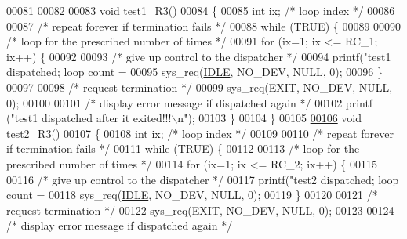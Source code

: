 \begin{DoxyCode}
00081 
00082 
\hypertarget{procs-r3_8c_source_l00083}{}\hyperlink{procs-r3_8c_ae4496e9c01adc7562ce34516c13226a0}{00083} \textcolor{keywordtype}{void} \hyperlink{procs-r3_8c_ae4496e9c01adc7562ce34516c13226a0}{test1_R3}()
00084 \{
00085         \textcolor{keywordtype}{int} ix; \textcolor{comment}{/* loop index */}
00086         
00087         \textcolor{comment}{/* repeat forever if termination fails */}
00088         \textcolor{keywordflow}{while} (TRUE) \{
00089 
00090                 \textcolor{comment}{/* loop for the prescribed number of times */}
00091                 \textcolor{keywordflow}{for} (ix=1; ix <= RC\_1; ix++) \{
00092 
00093                         \textcolor{comment}{/* give up control to the dispatcher */}
00094                         printf(\textcolor{stringliteral}{"test1 dispatched; loop count = %
00095                         sys\_req(\hyperlink{_m_p_x___r5_8h_a9c21a7caee326d7803b94ae1952b27ca}{IDLE}, NO\_DEV, NULL, 0);
00096                 \}
00097 
00098                 \textcolor{comment}{/* request termination */}
00099                 sys\_req(EXIT, NO\_DEV, NULL, 0);
00100 
00101                 \textcolor{comment}{/* display error message if dispatched again */}
00102                 printf (\textcolor{stringliteral}{"test1 dispatched after it exited!!!\(\backslash\)n"});
00103         \}
00104  \}
00105 
\hypertarget{procs-r3_8c_source_l00106}{}\hyperlink{procs-r3_8c_ab61a49e4507b3dba1bfad0cc9510d0a6}{00106} \textcolor{keywordtype}{void} \hyperlink{procs-r3_8c_ab61a49e4507b3dba1bfad0cc9510d0a6}{test2_R3}()
00107 \{
00108         \textcolor{keywordtype}{int} ix; \textcolor{comment}{/* loop index */}
00109         
00110         \textcolor{comment}{/* repeat forever if termination fails */}
00111         \textcolor{keywordflow}{while} (TRUE) \{
00112 
00113                 \textcolor{comment}{/* loop for the prescribed number of times */}
00114                 \textcolor{keywordflow}{for} (ix=1; ix <= RC\_2; ix++) \{
00115 
00116                         \textcolor{comment}{/* give up control to the dispatcher */}
00117                         printf(\textcolor{stringliteral}{"test2 dispatched; loop count = %
00118                         sys\_req(\hyperlink{_m_p_x___r5_8h_a9c21a7caee326d7803b94ae1952b27ca}{IDLE}, NO\_DEV, NULL, 0);
00119                 \}
00120 
00121                 \textcolor{comment}{/* request termination */}
00122                 sys\_req(EXIT, NO\_DEV, NULL, 0);
00123 
00124                 \textcolor{comment}{/* display error message if dispatched again */}
}}
\end{DoxyCode}
